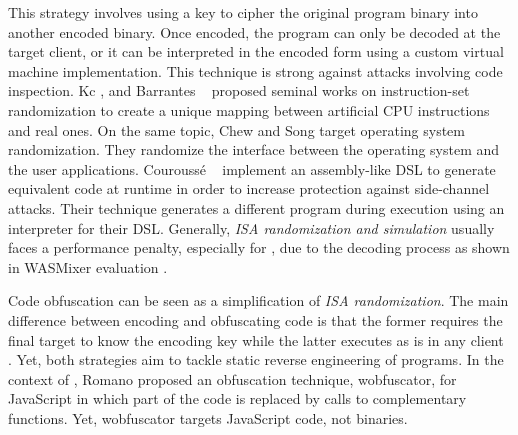 \begin{strategy}
    \label{isa_rand}

    This strategy involves using a key to cipher the original program binary into another encoded binary. 
    Once encoded, the program can only be decoded at the target client, or it can be interpreted in the encoded form using a custom virtual machine implementation. 
    This technique is strong against attacks involving code inspection. 
    Kc \etal \cite{Kc03}, and Barrantes \etal~\cite{barrantes2003randomized} proposed seminal works on instruction-set randomization 
    to create a unique mapping between artificial CPU instructions and real ones.
    On the same topic, Chew and Song \cite{Chew02mitigatingbuffer} target operating system randomization. They randomize the interface between the operating system and the user applications.
    Courouss{\'e} \etal~\cite{courousse2016runtime} implement an assembly-like DSL to generate equivalent code at runtime in order to increase protection against side-channel attacks. 
    Their technique generates a different program during execution using an interpreter for their DSL.
    Generally, \emph{ISA randomization and simulation} usually faces a performance penalty, especially for \Wasm, due to the decoding process as shown in WASMixer evaluation \cite{wasmixer}.
\end{strategy}


\begin{strategy}
    \label{obfusscation}
    Code obfuscation can be seen as a simplification of \emph{ISA randomization}. 
    The main difference between encoding and obfuscating code is that the former requires the final target to know the encoding key while the latter executes as is in any client \cite{10.1145/3176258}. 
    Yet, both strategies aim to tackle static reverse engineering of programs.
    In the context of \Wasm, Romano \etal \cite{wobfuscator} proposed an obfuscation technique, wobfuscator, for JavaScript in which part of the code is replaced by calls to complementary \Wasm functions.
    Yet, wobfuscator targets JavaScript code, not \Wasm binaries.
\end{strategy}



